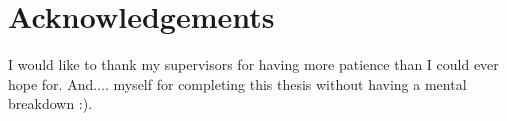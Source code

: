 \thispagestyle{empty}

\section*{Acknowledgements}

I would like to thank my supervisors for having more patience than I could 
ever hope for. And.... myself for completing this thesis without having 
a mental breakdown :).


